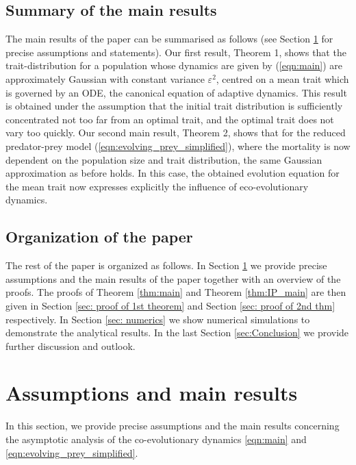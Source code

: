 \documentclass[]{article}
\theoremstyle{remark}
\begin{document}
\subsection{Summary of the main results}

The main results of the paper can be summarised as follows (see Section \ref{sec: assumptions and main results} for precise assumptions and statements). Our first result, Theorem 1, shows that the trait-distribution for a population whose dynamics are given by (\ref{eqn:main}) are approximately Gaussian with constant variance $\varepsilon^2$, centred on a mean trait which is governed by an ODE, the canonical equation of adaptive dynamics. This result is obtained under the assumption that the initial trait distribution is sufficiently concentrated not too far from an optimal trait, and the optimal trait does not vary too quickly. Our second main result, Theorem 2, shows that for the reduced predator-prey model (\ref{eqn:evolving_prey_simplified}), where the mortality is now dependent on the population size and trait distribution, the same Gaussian approximation as before holds. In this case, the obtained evolution equation for the mean trait now expresses explicitly the influence of eco-evolutionary dynamics.



\subsection{Organization of the paper}
The rest of the paper is organized as follows. In Section \ref{sec: assumptions and main results} we provide precise assumptions and the main results of the paper together with an overview of the proofs. The proofs of Theorem \ref{thm:main} and Theorem \ref{thm:IP_main} are then given in Section \ref{sec: proof of 1st theorem} and Section \ref{sec: proof of 2nd thm} respectively. In Section \ref{sec: numerics} we show numerical simulations to demonstrate the analytical results. In the last Section \ref{sec:Conclusion} we provide further discussion and outlook.

\section{Assumptions and main results}
\label{sec: assumptions and main results}
In this section, we provide precise assumptions and the main results concerning the asymptotic analysis of the co-evolutionary dynamics \eqref{eqn:main} and \eqref{eqn:evolving_prey_simplified}.
\end{document}
